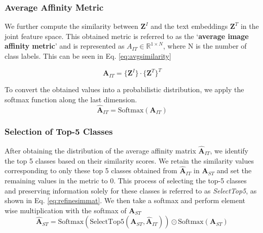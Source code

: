 



\subsubsection{Average Affinity Metric}
We further compute the similarity between $\textbf{Z}^I$ and the text embeddings $\textbf{Z}^T$ in the joint feature space. This obtained metric is referred to as the `\textbf{average image affinity metric}' and is represented as $A_{IT} \in \mathbb{R}^{1 \times N}$, where N is the number of class labels. This can be seen in Eq. \ref{eq:avgsimilarity}

\begin{equation}
\label{eq:avgsimilarity}
    \text{$\textbf{A}_{IT}$} = \{\textbf{Z}^I\} \cdot \{\textbf{Z}^T\}^T
\end{equation}

To convert the obtained values into a probabilistic distribution, we apply the softmax function along the last dimension.
\begin{equation}
\label{eq:softmaxavgsimilarity}
    \hat{\textbf{A}}_{IT} = \text{Softmax}(\textbf{A}_{IT})
\end{equation}

\subsubsection{Selection of Top-5 Classes}
After obtaining the distribution of the average affinity matrix $\hat{\textbf{A}}_{IT}$, we identify the top 5 classes based on their similarity scores. We retain the similarity values corresponding to only these top 5 classes obtained from $\hat{\textbf{A}}_{IT}$ in $\textbf{A}_{ST}$ and set the remaining values in the metric to 0. 
This process of selecting the top-5 classes and preserving information solely for these classes is referred to as \textit{SelectTop5}, as shown in Eq. \ref{eq:refinesimmat}. We then take a softmax and perform element wise multiplication with the softmax of ${\textbf{A}}_{ST}$
\begin{equation}
\label{eq:refinesimmat}
    \hat{\textbf{A}}_{ST}  = \text{Softmax}(\text{SelectTop5}( \textbf{A}_{ST}, \hat{\textbf{A}}_{IT})) \odot \text{Softmax}(\textbf{A}_{ST})
\end{equation}

